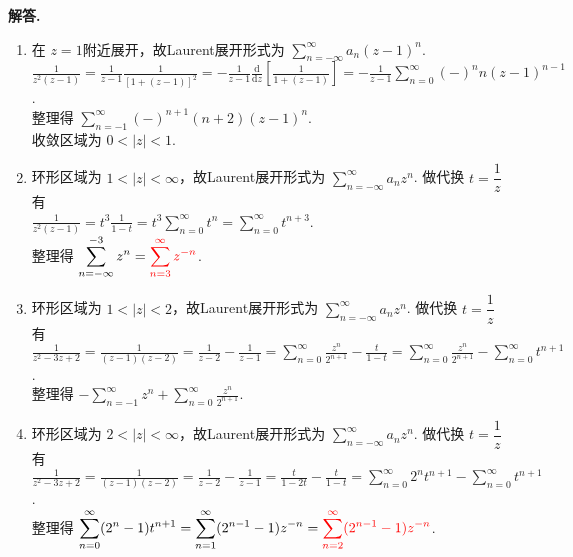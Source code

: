 \documentclass[11pt]{ctexart}
\newenvironment{solution}{\par\noindent\textbf{解答. }}{\par}
\begin{document}
\begin{solution}
    \begin{enumerate}[(1)]
        \item 在 $z=1$附近展开，故Laurent展开形式为 $\displaystyle\sum_{n=-\infty}^{\infty}a_n(z-1)^n$.\\[12pt]
              $\displaystyle\frac{1}{z^2(z-1)} = \frac{1}{z-1}\frac{1}{[1+(z-1)]^2} 
              = -\frac{1}{z-1}\frac{\text{d}}{\text{d}z}\left[\frac{1}{1+(z-1)}\right]
              = -\frac{1}{z-1}\sum_{n=0}^{\infty}(-)^nn(z-1)^{n-1}$.\\[12pt]
              整理得 $\displaystyle\sum_{n=-1}^{\infty}(-)^{n+1}(n+2)(z-1)^n$.\\[12pt]
              收敛区域为 $0<\left|z\right|<1$.
        \item 环形区域为 $1<\left|z\right|<\infty$，故Laurent展开形式为 $\displaystyle\sum_{n=-\infty}^{\infty}a_nz^n$. 做代换 $t=\dfrac{1}{z}$ 有\\[12pt]
              $\displaystyle\frac{1}{z^2(z-1)} = t^3\frac{1}{1-t} = t^3\sum_{n=0}^{\infty}t^n 
              = \sum_{n=0}^{\infty}t^{n+3}$.\\[12pt]
              整理得 $\displaystyle\sum_{n=-\infty}^{-3}z^n = \textcolor{red}{\sum_{n=3}^{\infty}z^{-n}}$.
        \item 环形区域为 $1<\left|z\right|<2$，故Laurent展开形式为 $\displaystyle\sum_{n=-\infty}^{\infty}a_nz^n$. 做代换 $t=\dfrac{1}{z}$ 有\\[12pt]
              $\displaystyle\frac{1}{z^2-3z+2} = \frac{1}{(z-1)(z-2)}
              = \frac{1}{z-2} - \frac{1}{z-1} = \sum_{n=0}^{\infty}\frac{z^n}{2^{n+1}} - \frac{t}{1-t}
              = \sum_{n=0}^{\infty}\frac{z^n}{2^{n+1}} - \sum_{n=0}^{\infty}t^{n+1}$.\\[12pt]
              整理得 $\displaystyle -\sum_{n=-1}^{\infty}z^n + \sum_{n=0}^{\infty}\frac{z^n}{2^{n+1}}$.
        \item 环形区域为 $2<\left|z\right|<\infty$，故Laurent展开形式为 $\displaystyle\sum_{n=-\infty}^{\infty}a_nz^n$. 做代换 $t=\dfrac{1}{z}$ 有\\[12pt]
              $\displaystyle\frac{1}{z^2-3z+2} = \frac{1}{(z-1)(z-2)}
              = \frac{1}{z-2} - \frac{1}{z-1} = \frac{t}{1-2t} - \frac{t}{1-t}
              = \sum_{n=0}^{\infty}2^{n}t^{n+1} - \sum_{n=0}^{\infty}t^{n+1}$.\\[12pt]
              整理得 $\displaystyle\sum_{n=0}^{\infty}(2^{n}-1)t^{n+1} = \sum_{n=1}^{\infty}(2^{n-1}-1)z^{-n} = \textcolor{red}{\sum_{n=2}^{\infty}(2^{n-1}-1)z^{-n}}$.

\end{enumerate}
\end{solution}
\end{document}
